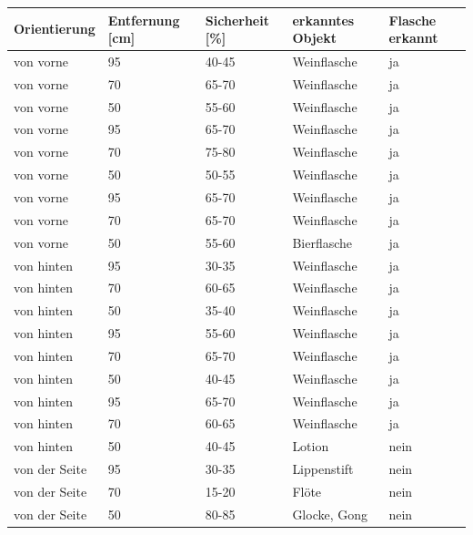 \begin{table} [H]
	\centering
	\begin{tabular} {l l l l l}
		Orientierung & Entfernung [cm] & Sicherheit [\%] & erkanntes Objekt & Flasche erkannt\\  \hline
	von vorne&	95&	40-45&	Weinflasche\cellcolor{green}&ja\cellcolor{green}\\
	von vorne&	70&	65-70&	Weinflasche\cellcolor{green}&ja\cellcolor{green}\\
	von vorne&	50&	55-60&	Weinflasche\cellcolor{green}&ja\cellcolor{green}\\
	von vorne&	95&	65-70&	Weinflasche\cellcolor{green}&ja\cellcolor{green}\\
	von vorne&	70&	75-80&	Weinflasche\cellcolor{green}&ja\cellcolor{green}\\
	von vorne&	50&	50-55&	Weinflasche\cellcolor{green}&ja\cellcolor{green}\\
	von vorne&	95&	65-70&	Weinflasche\cellcolor{green}&ja\cellcolor{green}\\
	von vorne&	70&	65-70&	Weinflasche\cellcolor{green}&ja\cellcolor{green}\\
	von vorne&	50&	55-60&	Bierflasche\cellcolor{red}&ja\cellcolor{green}\\ \hline
	von hinten&	95&	30-35&	Weinflasche\cellcolor{green}&ja\cellcolor{green}\\
	von hinten&	70&	60-65&	Weinflasche\cellcolor{green}&ja\cellcolor{green}\\
	von hinten&	50&	35-40&	Weinflasche\cellcolor{green}&ja\cellcolor{green}\\
	von hinten&	95&	55-60&	Weinflasche\cellcolor{green}&ja\cellcolor{green}\\
	von hinten&	70&	65-70&	Weinflasche\cellcolor{green}&ja\cellcolor{green}\\
	von hinten&	50&	40-45&	Weinflasche\cellcolor{green}&ja\cellcolor{green}\\
	von hinten&	95&	65-70&	Weinflasche\cellcolor{green}&ja\cellcolor{green}\\
	von hinten&	70&	60-65&	Weinflasche\cellcolor{green}&ja\cellcolor{green}\\
	von hinten&	50&	40-45&	Lotion\cellcolor{red}&nein\cellcolor{red}\\  \hline
	von der Seite&	95&	30-35&	Lippenstif\cellcolor{red}t&nein\cellcolor{red}\\
	von der Seite&	70&	15-20&	Flöte\cellcolor{red}&nein\cellcolor{red}\\
	von der Seite&	50&	80-85&	Glocke, Gong\cellcolor{red}&nein\cellcolor{red}\\

\end{tabular}
\end{table}

